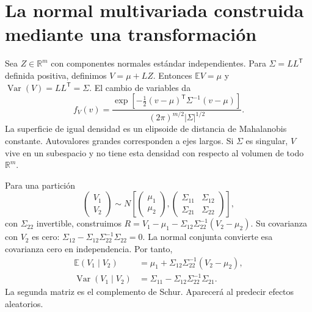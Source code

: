 \documentclass[11pt,a4paper]{article}
\newcommand{\R}{\mathbb R}
\newcommand{\E}{\mathbb E}
\newcommand{\T}{^{\mathsf T}}
\DeclareMathOperator{\Var}{Var}
\theoremstyle{definition}
\begin{document}
\section{La normal multivariada construida mediante una transformación}
Sea $Z\in\R^m$ con componentes normales estándar independientes. Para $\Sigma=LL\T$ definida positiva, definimos $V=\mu+LZ$. Entonces
$\E V=\mu$ y $\Var(V)=LL\T=\Sigma$. El cambio de variables da
\[
f_V(v)=\frac{\exp[-\tfrac12(v-\mu)\T\Sigma^{-1}(v-\mu)]}
{(2\pi)^{m/2}|\Sigma|^{1/2}}.
\]
La superficie de igual densidad es un elipsoide de distancia de Mahalanobis constante. Autovalores grandes corresponden a ejes largos. Si $\Sigma$ es singular, $V$ vive en un subespacio y no tiene esta densidad con respecto al volumen de todo $\R^m$.

Para una partición
\[
\begin{pmatrix}V_1\\V_2\end{pmatrix}
\sim N\left[
\begin{pmatrix}\mu_1\\\mu_2\end{pmatrix},
\begin{pmatrix}\Sigma_{11}&\Sigma_{12}\\\Sigma_{21}&\Sigma_{22}\end{pmatrix}
\right],
\]
con $\Sigma_{22}$ invertible, construimos
$R=V_1-\mu_1-\Sigma_{12}\Sigma_{22}^{-1}(V_2-\mu_2)$.
Su covarianza con $V_2$ es cero:
$\Sigma_{12}-\Sigma_{12}\Sigma_{22}^{-1}\Sigma_{22}=0$.
La normal conjunta convierte esa covarianza cero en independencia. Por tanto,
\[
\begin{aligned}
\E(V_1\mid V_2)&=\mu_1+\Sigma_{12}\Sigma_{22}^{-1}(V_2-\mu_2),\\
\Var(V_1\mid V_2)&=\Sigma_{11}-\Sigma_{12}\Sigma_{22}^{-1}\Sigma_{21}.
\end{aligned}
\]
La segunda matriz es el complemento de Schur. Aparecerá al predecir efectos aleatorios.
\end{document}
